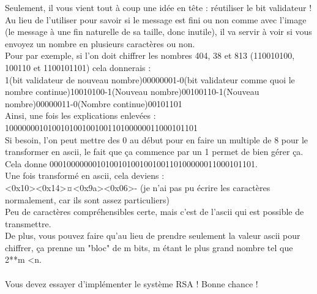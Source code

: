 \documentclass[12pt]{article}
\begin{document}
Seulement, il vous vient tout à coup une idée en tête : réutiliser le bit validateur ! Au lieu de l'utiliser pour savoir si le message est fini ou non comme avec l'image (le message à une fin naturelle de sa taille, donc inutile), il va servir à voir si vous envoyez un nombre en plusieurs caractères ou non.\\
Pour par exemple, si l'on doit chiffrer les nombres 404, 38 et 813 (110010100, 100110 et 1100101101) cela donnerais :\\
1(bit validateur de nouveau nombre)00000001-0(bit validateur comme quoi le nombre continue)10010100-1(Nouveau nombre)00100110-1(Nouveau nombre)00000011-0(Nombre continue)00101101\\
Ainsi, une fois les explications enlevées :\\
100000001010010100100100110100000011000101101\\
Si besoin, l'on peut mettre des 0 au début pour en faire un multiple de 8 pour le transformer en ascii, le fait que ça commence par un 1 permet de bien gérer ça.\\
Cela donne 000100000001010010100100100110100000011000101101.\\
Une fois transformé en ascii, cela deviens :\\
\textless0x10\textgreater\textless0x14\textgreater¤\textless0x9a\textgreater\textless0x06\textgreater- (je n'ai pas pu écrire les caractères normalement, car ils sont assez particuliers)\\ 
Peu de caractères compréhensibles certe, mais c'est de l'ascii qui est possible de transmettre.\\
De plus, vous pouvez faire qu'au lieu de prendre seulement la valeur ascii pour chiffrer, ça prenne un "bloc" de m bits, m étant le plus grand nombre tel que 2**m \textless n.
\\\\
Vous devez essayer d'implémenter le système RSA ! Bonne chance !
\end{document}
